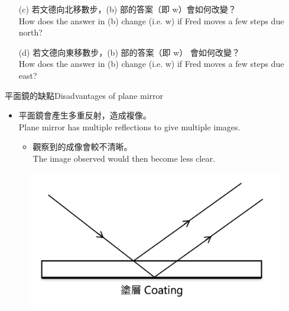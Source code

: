\documentclass[beamer=true]{standalone}
\begin{document}
\begin{eg}
    \begin{itemize}
        \item [(c)] 若文德向北移數步，(b) 部的答案（即 w）會如何改變？\\How does the answer in (b) change (i.e. w) if Fred moves a few steps due north?
    \end{itemize}

\end{eg}

\begin{eg}
    \begin{itemize}
        \item [(d)] 若文德向東移數步，(b) 部的答案（即 w） 會如何改變？\\How does the answer in (b) change (i.e. w) if Fred moves a few steps due east?
    \end{itemize}

\end{eg}

\begin{frame}{平面鏡的缺點Disadvantages of plane mirror}
    \begin{itemize}
        \item 平面鏡會產生多重反射，造成複像。\\Plane mirror has multiple reflections to give multiple images.
        \begin{itemize}
            \item 觀察到的成像會較不清晰。\\The image observed would then become less clear.
        \end{itemize}
    \end{itemize}\bigskip
    
    \begin{figure}
        \centering
        \includegraphics[width=0.5\linewidth]{assets/idjnqjdiqjndqdo189d9nn18u982.png}
    \end{figure}
    
\end{frame}
\end{document}

